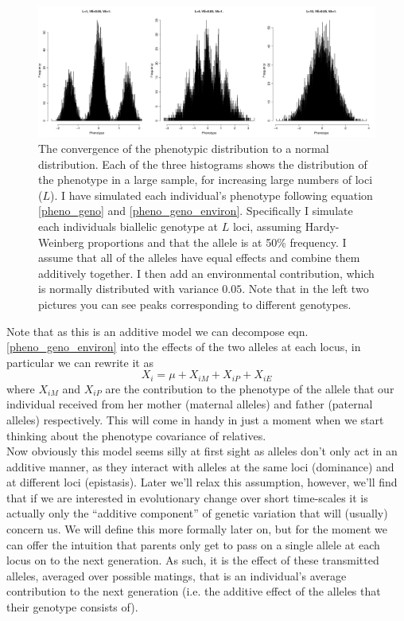 \begin{figure}
\begin{center}
\includegraphics[width=\textwidth]{figures/QT1.png}
\end{center}
\caption{The convergence of the phenotypic distribution to a normal
  distribution. Each of the three histograms shows the distribution of
the phenotype in a large sample, for increasing large numbers of loci ($L$). I have simulated each individual's
phenotype following equation \ref{pheno_geno} and \ref{pheno_geno_environ}. Specifically I simulate each
individuals biallelic genotype at $L$ loci, assuming Hardy-Weinberg proportions
and that the allele is at 50\% frequency. I assume that all of the
alleles have equal effects and combine them additively together. I then
add an environmental contribution, which is normally distributed with
variance $0.05$. Note that in the left two pictures you can see peaks
corresponding to different genotypes.} \label{fig:QT1}
\end{figure}

Note that as this is an additive model we can decompose eqn. \ref{pheno_geno_environ} into the
effects of the two alleles at each locus, in particular we can rewrite
it as
\begin{equation}
X_i = \mu + X_{iM}+X_{iP} +X_{iE}
\end{equation}
where $X_{iM}$ and $X_{iP}$ are the contribution to the phenotype of
the allele that our individual received from her mother (maternal
alleles) and father (paternal alleles) respectively. This will come in
handy in just a moment when we start thinking about the phenotype covariance of relatives.\\

Now obviously this model seems silly at first sight as alleles don't
only act in an additive manner, as they interact with alleles at the
same loci (dominance) and at different loci (epistasis). Later we'll
relax this assumption, 
however, we'll find that if we are interested in evolutionary change
over short time-scales it is actually only the ``additive
component'' of genetic variation that will (usually) concern us. 
We will define this more formally later on, but for the moment 
we can offer the intuition that parents only get to pass on a single
allele at each locus on to the next generation. As such, it is the
effect of these transmitted alleles, averaged over possible matings,
that is an individual's average contribution  to the next generation
(i.e. the additive effect of the alleles that their genotype consists of).



